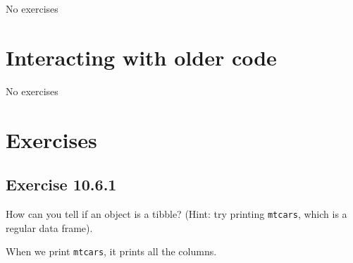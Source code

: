 \documentclass[]{book}
\theoremstyle{plain}
\theoremstyle{remark}
\begin{document}
No exercises

\hypertarget{interacting-with-older-code}{%
\section{Interacting with older
code}\label{interacting-with-older-code}}

No exercises

\hypertarget{exercises}{%
\section{Exercises}\label{exercises}}

\hypertarget{exercise-10.6.1}{%
\subsection*{\texorpdfstring{Exercise
{10.6.1}}{Exercise 10.6.1}}\label{exercise-10.6.1}}

How can you tell if an object is a tibble? (Hint: try printing
\texttt{mtcars}, which is a regular data frame).

When we print \texttt{mtcars}, it prints all the columns.
\end{document}
